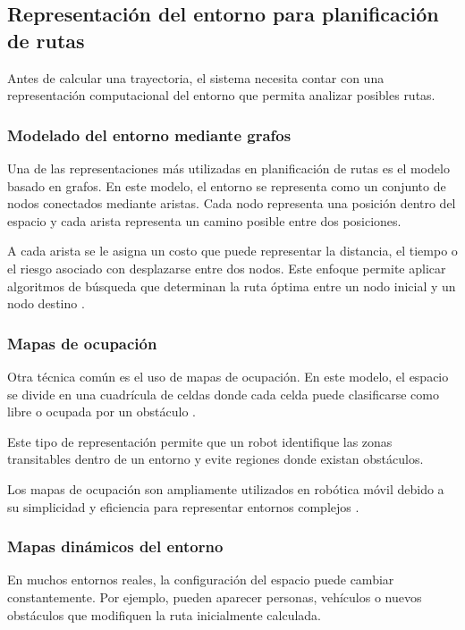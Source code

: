 \subsection{Representación del entorno para planificación de rutas}

Antes de calcular una trayectoria, el sistema necesita contar con una representación computacional del entorno que permita analizar posibles rutas.

\subsubsection{Modelado del entorno mediante grafos}

Una de las representaciones más utilizadas en planificación de rutas es el modelo basado en grafos. En este modelo, el entorno se representa como un conjunto de nodos conectados mediante aristas. Cada nodo representa una posición dentro del espacio y cada arista representa un camino posible entre dos posiciones.

A cada arista se le asigna un costo que puede representar la distancia, el tiempo o el riesgo asociado con desplazarse entre dos nodos. Este enfoque permite aplicar algoritmos de búsqueda que determinan la ruta óptima entre un nodo inicial y un nodo destino \cite{lavalle2006planning}.

\subsubsection{Mapas de ocupación}

Otra técnica común es el uso de mapas de ocupación. En este modelo, el espacio se divide en una cuadrícula de celdas donde cada celda puede clasificarse como libre o ocupada por un obstáculo \cite{elfes1989nav}.

Este tipo de representación permite que un robot identifique las zonas transitables dentro de un entorno y evite regiones donde existan obstáculos.

Los mapas de ocupación son ampliamente utilizados en robótica móvil debido a su simplicidad y eficiencia para representar entornos complejos \cite{elfes1989nav}.

\subsubsection{Mapas dinámicos del entorno}

En muchos entornos reales, la configuración del espacio puede cambiar constantemente. Por ejemplo, pueden aparecer personas, vehículos o nuevos obstáculos que modifiquen la ruta inicialmente calculada.

